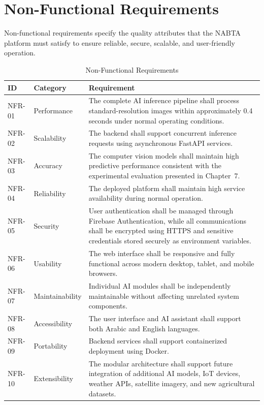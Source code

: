 \section{Non-Functional Requirements}
\label{sec:nonfunctional_requirements}

Non-functional requirements specify the quality attributes that the NABTA platform must satisfy to ensure reliable, secure, scalable, and user-friendly operation.

\begin{table}[H]
\centering
\caption{Non-Functional Requirements}
\label{tab:nfr}
\renewcommand{\arraystretch}{1.4}
\begin{tabularx}{\textwidth}{l l X}
\toprule
\textbf{ID} & \textbf{Category} & \textbf{Requirement} \\
\midrule
NFR-01 & Performance & The complete AI inference pipeline shall process standard-resolution images within approximately 0.4 seconds under normal operating conditions.\\

NFR-02 & Scalability & The backend shall support concurrent inference requests using asynchronous FastAPI services.\\

NFR-03 & Accuracy & The computer vision models shall maintain high predictive performance consistent with the experimental evaluation presented in Chapter~7.\\

NFR-04 & Reliability & The deployed platform shall maintain high service availability during normal operation.\\

NFR-05 & Security & User authentication shall be managed through Firebase Authentication, while all communications shall be encrypted using HTTPS and sensitive credentials stored securely as environment variables.\\

NFR-06 & Usability & The web interface shall be responsive and fully functional across modern desktop, tablet, and mobile browsers.\\

NFR-07 & Maintainability & Individual AI modules shall be independently maintainable without affecting unrelated system components.\\

NFR-08 & Accessibility & The user interface and AI assistant shall support both Arabic and English languages.\\

NFR-09 & Portability & Backend services shall support containerized deployment using Docker.\\

NFR-10 & Extensibility & The modular architecture shall support future integration of additional AI models, IoT devices, weather APIs, satellite imagery, and new agricultural datasets.\\
\bottomrule
\end{tabularx}
\end{table}

